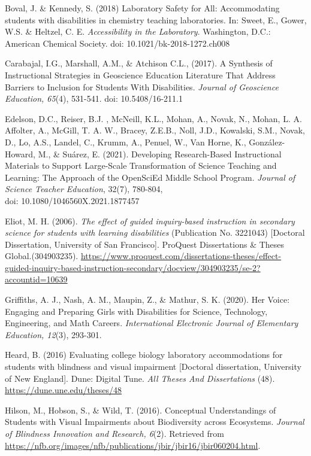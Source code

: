 \documentclass[11.5pt]{sig-alternate}
\begin{document}
\begin{large}
Boval, J. \& Kennedy, S. (2018) Laboratory Safety for All: Accommodating students with disabilities in chemistry teaching laboratories. In: Sweet, E., Gower, W.S. \& Heltzel, C. E. \textit{Accessibility in the Laboratory}. Washington, D.C.: American Chemical Society. doi: 10.1021/bk-2018-1272.ch008

Carabajal, I.G., Marshall, A.M., \&  Atchison C.L., (2017). A Synthesis of Instructional Strategies in Geoscience Education Literature That Address Barriers to Inclusion for Students With Disabilities. \textit{Journal of Geoscience Education, 65}(4), 531-541. doi: 10.5408/16-211.1

Edelson, D.C., Reiser, B.J. , McNeill, K.L., Mohan, A., Novak, N., Mohan, L. A. Affolter, A., McGill, T. A. W., Bracey, Z.E.B., Noll, J.D., Kowalski, S.M., Novak, D., Lo, A.S.,  Landel, C., Krumm, A., Penuel, W., Van Horne, K., González-Howard, M., \& Suárez, E. (2021). Developing Research-Based Instructional Materials to Support Large-Scale Transformation of Science Teaching and Learning: The Approach of the OpenSciEd Middle School Program. \textit{Journal of Science Teacher Education}, 32(7), 780-804, \\doi: 10.1080/1046560X.2021.1877457

Eliot, M. H. (2006). \textit{The effect of guided inquiry-based instruction in secondary science for students with learning disabilities} (Publication No. 3221043) [Doctoral Dissertation, University of San Francisco]. ProQuest Dissertations \& Theses Global.(304903235). \url{https://www.proquest.com/dissertations-theses/effect-guided-inquiry-based-instruction-secondary/docview/304903235/se-2?accountid=10639}

Griffiths, A. J., Nash, A. M., Maupin, Z., \& Mathur, S. K. (2020). Her Voice: Engaging and Preparing Girls with Disabilities for Science, Technology, Engineering, and Math Careers. \textit{International Electronic Journal of Elementary Education, 12}(3), 293-301.

Heard, B. (2016) Evaluating college biology laboratory accommodations for students with blindness and visual impairment [Doctoral  dissertation, University of New England]. Dune: Digital Tune. \textit{All Theses And Dissertations }(48). \url{https://dune.une.edu/theses/48}

Hilson, M., Hobson, S., \& Wild, T. (2016). Conceptual Understandings of Students with Visual Impairments about Biodiversity across Ecosystems. \textit{Journal of Blindness Innovation and Research, 6}(2). Retrieved from \url{https://nfb.org/images/nfb/publications/jbir/jbir16/jbir060204.html}.


\end{large}
\end{document}
